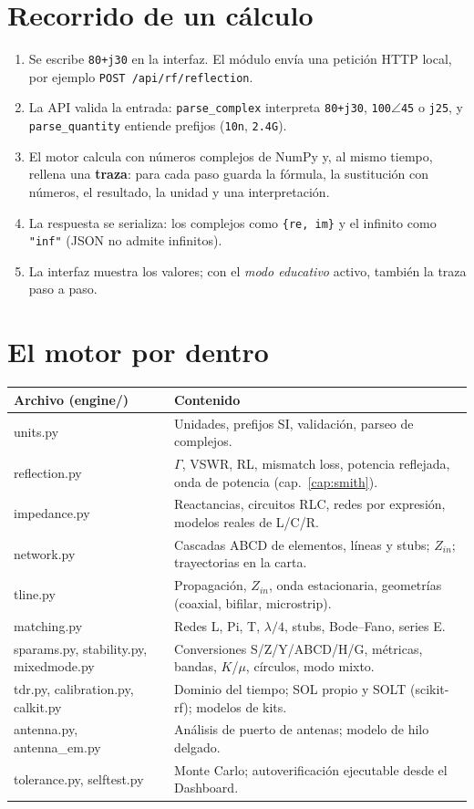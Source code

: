 \section{Recorrido de un cálculo}
\begin{enumerate}
\item Se escribe \texttt{80+j30} en la interfaz. El módulo envía una petición HTTP local, por ejemplo \texttt{POST /api/rf/reflection}.
\item La API valida la entrada: \texttt{parse\_complex} interpreta \texttt{80+j30}, \texttt{100}$\angle$\texttt{45} o \texttt{j25}, y
\texttt{parse\_quantity} entiende prefijos (\texttt{10n}, \texttt{2.4G}).
\item El motor calcula con números complejos de NumPy y, al mismo tiempo, rellena una \textbf{traza}: para cada paso guarda la fórmula, la
sustitución con números, el resultado, la unidad y una interpretación.
\item La respuesta se serializa: los complejos como \texttt{\{re, im\}} y el infinito como \texttt{"inf"} (JSON no admite infinitos).
\item La interfaz muestra los valores; con el \emph{modo educativo} activo, también la traza paso a paso.
\end{enumerate}

\section{El motor por dentro}
\begin{center}\small
\begin{tabularx}{\linewidth}{@{}>{\ttfamily}p{5.2cm}X@{}}\toprule
\normalfont\textbf{Archivo (engine/)} & \textbf{Contenido}\\ \midrule
units.py & Unidades, prefijos SI, validación, parseo de complejos.\\
reflection.py & $\Gamma$, VSWR, RL, mismatch loss, potencia reflejada, onda de potencia (cap.~\ref{cap:smith}).\\
impedance.py & Reactancias, circuitos RLC, redes por expresión, modelos reales de L/C/R.\\
network.py & Cascadas ABCD de elementos, líneas y stubs; $Z_{in}$; trayectorias en la carta.\\
tline.py & Propagación, $Z_{in}$, onda estacionaria, geometrías (coaxial, bifilar, microstrip).\\
matching.py & Redes L, Pi, T, $\lambda/4$, stubs, Bode--Fano, series E.\\
sparams.py, stability.py, mixedmode.py & Conversiones S/Z/Y/ABCD/H/G, métricas, bandas, $K$/$\mu$, círculos, modo mixto.\\
tdr.py, calibration.py, calkit.py & Dominio del tiempo; SOL propio y SOLT (scikit-rf); modelos de kits.\\
antenna.py, antenna\_em.py & Análisis de puerto de antenas; modelo de hilo delgado.\\
tolerance.py, selftest.py & Monte Carlo; autoverificación ejecutable desde el Dashboard.\\ \bottomrule
\end{tabularx}
\end{center}

